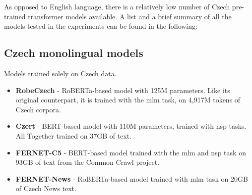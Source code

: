 \begin{figure}
\end{figure}

As opposed to English language, there is a relatively low number of Czech pre-trained transformer models available. A list and a brief summary of all the models tested in the experiments can be found in the following:




\subsection{Czech monolingual models}
Models trained solely on Czech data.
\begin{itemize}
    \item \textbf{RobeCzech} \cite{strakarobeczech} - RoBERTa-based model with 125M parameters. Like its original counterpart, it is trained with the \gls{mlm} task, on 4,917M tokens of Czech corpora.
    \item \textbf{Czert} \cite{sido-etal-2021-czert} - BERT-based model with 110M parameters, trained with \gls{nsp} tasks. All Together trained on 37GB of text. 
    \item \textbf{FERNET-C5} \cite{lehevcka2021comparison} - BERT-based model trained with the \gls{mlm} and \gls{nsp} task on 93GB of text from the Common Crawl project.
    \item \textbf{FERNET-News} \cite{lehevcka2021comparison} - RoBERTa-based model trained with \gls{mlm} task on 20GB of Czech News text.
\end{itemize}




